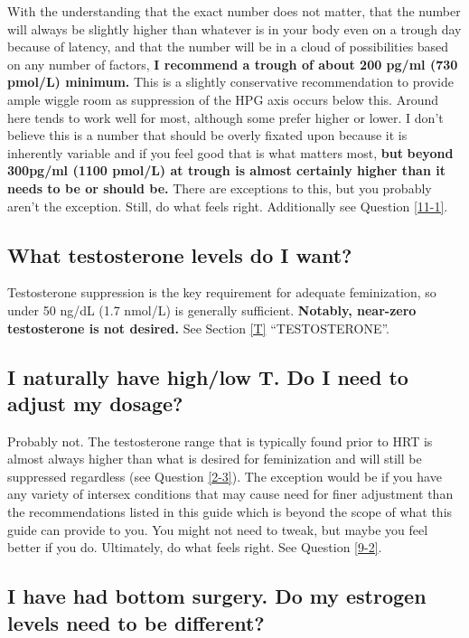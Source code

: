 \documentclass{article}
\begin{document}
With the understanding that the exact number does not matter, that the number will always be slightly higher than whatever is in your body even on a trough day because of latency, and that the number will be in a cloud of possibilities based on any number of factors, \textbf{I recommend a trough of about 200 pg/ml (730 pmol/L) minimum.} This is a slightly conservative recommendation to provide ample wiggle room as suppression of the HPG axis occurs below this. Around here tends to work well for most, although some prefer higher or lower. I don’t believe this is a number that should be overly fixated upon because it is inherently variable and if you feel good that is what matters most, \textbf{but} \textbf{beyond 300pg/ml (1100 pmol/L) at trough is almost certainly higher than it needs to be or should be.} There are exceptions to this, but you probably aren't the exception. Still, do what feels right. Additionally see Question \ref{11-1}.

\subsection{What testosterone levels do I want?}

Testosterone suppression is the key requirement for adequate feminization, so under 50 ng/dL (1.7 nmol/L) is generally sufficient. \textbf{Notably, near-zero testosterone is not desired.} See Section \ref{T} “TESTOSTERONE”.

\subsection{I naturally have high/low T. Do I need to adjust my dosage?}

Probably not. The testosterone range that is typically found prior to HRT is almost always higher than what is desired for feminization and will still be suppressed regardless (see Question \ref{2-3}). The exception would be if you have any variety of intersex conditions that may cause need for finer adjustment than the recommendations listed in this guide which is beyond the scope of what this guide can provide to you. You might not need to tweak, but maybe you feel better if you do. Ultimately, do what feels right. See Question \ref{9-2}.

\subsection{I have had bottom surgery. Do my estrogen levels need to be different?}
\end{document}

